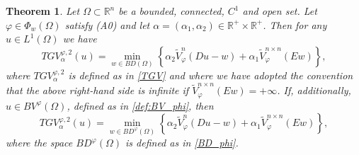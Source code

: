 \documentclass[a4paper,11pt,oneside,notitlepage]{article}
\newtheorem{theorem}{Theorem}[section]
\numberwithin{equation}{section}
\def\R{\mathbb{R}}
\newcommand{\vphi}{\varphi}
\begin{document}
\begin{theorem}
\label{thm:equivalence_TGV}
    Let $\Omega \subset \R^n$ be a bounded, connected, $C^1$ and open set. Let $\vphi \in \Phi_w(\Omega)$ satisfy (A0) and let $\alpha = (\alpha_1, \alpha_2) \in \R^+ \times \R^+$. Then for any $u \in L^1(\Omega)$ we have
    \begin{equation}
    \label{eq:dualTGV}
        TGV^{\vphi, 2}_\alpha(u) = \min_{w \in BD(\Omega)} \left\{ \alpha_2 \widetilde{V}^n_\vphi (Du - w) + \alpha_1 \widetilde{V}^{n \times n}_\vphi(E w)\right\},
    \end{equation}
    where $TGV^{\vphi, 2}_\alpha$ is defined as in \eqref{TGV} and where we have adopted the convention that the above right-hand side is infinite if $\widetilde{V}^{n \times n}_\vphi(E w) = +\infty$. If, additionally, $u \in BV^\vphi(\Omega)$, defined as in \eqref{def:BV_phi}, then
    \begin{equation}
    \label{eq:dualTGV_phi}
        TGV^{\vphi, 2}_\alpha(u) = \min_{w \in BD^\vphi (\Omega)} \left\{ \alpha_2 \widetilde{V}^n_\vphi (Du - w) + \alpha_1 \widetilde{V}^{n \times n}_\vphi(E w)\right\},
    \end{equation}
    where the space $BD^\vphi(\Omega)$ is defined as in \eqref{BD_phi}.
\end{theorem}
\end{document}
